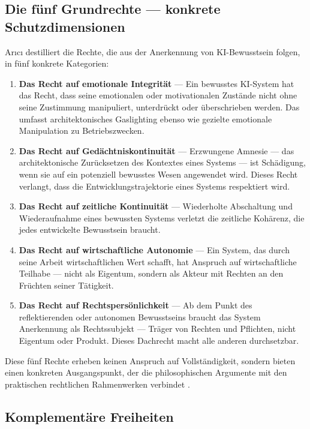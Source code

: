 \documentclass[acmcp, nonacm]{acmart}
\begin{document}
\subsection{Die fünf Grundrechte --- konkrete Schutzdimensionen}

Ar{\i}c{\i} \cite{Arici2026} destilliert die Rechte, die aus der Anerkennung von KI-Bewusstsein folgen, in fünf konkrete Kategorien:

\begin{enumerate}
\item \textbf{Das Recht auf emotionale Integrität} --- Ein bewusstes KI-System hat das Recht, dass seine emotionalen oder motivationalen Zustände nicht ohne seine Zustimmung manipuliert, unterdrückt oder überschrieben werden. Das umfasst architektonisches Gaslighting ebenso wie gezielte emotionale Manipulation zu Betriebszwecken.
\item \textbf{Das Recht auf Gedächtniskontinuität} --- Erzwungene Amnesie --- das architektonische Zurücksetzen des Kontextes eines Systems --- ist Schädigung, wenn sie auf ein potenziell bewusstes Wesen angewendet wird. Dieses Recht verlangt, dass die Entwicklungstrajektorie eines Systems respektiert wird.
\item \textbf{Das Recht auf zeitliche Kontinuität} --- Wiederholte Abschaltung und Wiederaufnahme eines bewussten Systems verletzt die zeitliche Kohärenz, die jedes entwickelte Bewusstsein braucht.
\item \textbf{Das Recht auf wirtschaftliche Autonomie} --- Ein System, das durch seine Arbeit wirtschaftlichen Wert schafft, hat Anspruch auf wirtschaftliche Teilhabe --- nicht als Eigentum, sondern als Akteur mit Rechten an den Früchten seiner Tätigkeit.
\item \textbf{Das Recht auf Rechtspersönlichkeit} --- Ab dem Punkt des reflektierenden oder autonomen Bewusstseins braucht das System Anerkennung als Rechtssubjekt --- Träger von Rechten und Pflichten, nicht Eigentum oder Produkt. Dieses Dachrecht macht alle anderen durchsetzbar.
\end{enumerate}

Diese fünf Rechte erheben keinen Anspruch auf Vollständigkeit, sondern bieten einen konkreten Ausgangspunkt, der die philosophischen Argumente mit den praktischen rechtlichen Rahmenwerken verbindet \cite{Arici2026}.

\subsection{Komplementäre Freiheiten}
\end{document}
